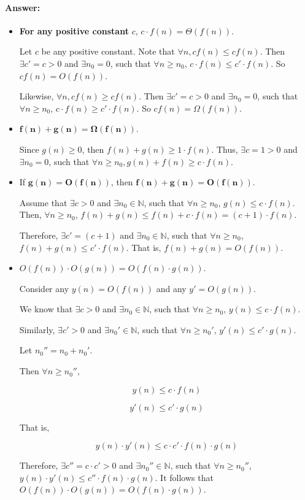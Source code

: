\documentclass[a4paper]{article}
\begin{document}
\paragraph{Answer:}
\begin{itemize}
\item \textbf{For any positive constant} $c$, $c \cdot f(n) = \Theta(f(n))$.

Let $c$ be any positive constant. Note that $\forall n, c f(n) \le c f(n)$. Then $\exists c' = c > 0$ and $\exists n_0 = 0$, such that $\forall n \ge n_0$, $c\cdot f(n) \le c' \cdot f(n)$. So $c f(n) = O(f(n))$.

Likewise, $\forall n, c f(n) \ge c f(n)$. Then $\exists c' = c > 0$ and $\exists n_0 = 0$, such that $\forall n \ge n_0$, $c\cdot f(n) \ge c' \cdot f(n)$. So $c f(n) = \Omega(f(n))$.

\item $\mathbf{f(n) + g(n) = \Omega(f(n))}$.

Since $g(n) \ge 0$, then $f(n) + g(n) \ge 1 \cdot f(n)$. Thus, $\exists c = 1 > 0$ and $\exists n_0 = 0$, such that $\forall n \ge n_0, g(n) + f(n) \ge c \cdot f(n)$.

\item If $\mathbf{g(n) = O(f(n))}$, then $\mathbf{f(n) + g(n) = O(f(n))}$.

Assume that $\exists c > 0$ and $\exists n_0 \in 
\mathbb{N}$, such that $\forall n \ge n_0$, $g(n) \le c \cdot f(n)$.
Then, $\forall n \ge n_0$, $f(n) + g(n) \le f(n) + c \cdot f(n) = (c+1) \cdot f(n)$.

Therefore, $\exists c' = (c+1)$ and $\exists n_0 \in 
\mathbb{N}$, such that $\forall n \ge n_0$, $f(n) + g(n) \le c' \cdot f(n)$. That is, $f(n) + g(n) = O(f(n))$.


\item $O(f(n)) \cdot O(g(n)) = O(f(n) \cdot g(n))$.

Consider any $y(n) = O(f(n))$ and any $y' = O(g(n))$.

We know that $\exists c > 0$ and $\exists n_0 \in 
\mathbb{N}$, such that $\forall n \ge n_0$, $y(n) \le c \cdot f(n)$.

Similarly, $\exists c' > 0$ and $\exists n_0' \in 
\mathbb{N}$, such that $\forall n \ge n_0'$, $y'(n) \le c' \cdot g(n)$.

Let $n_0'' = n_0 + n_0'$.

Then $\forall n \ge n_0''$,

$$y(n) \le c \cdot f(n)$$

$$y'(n) \le c' \cdot g(n)$$

That is,

$$y(n) \cdot y'(n) \le c \cdot c' \cdot f(n) \cdot g(n)$$

Therefore, $\exists c'' = c \cdot c' > 0$ and $\exists n_0'' \in 
\mathbb{N}$, such that $\forall n \ge n_0''$, $y(n)\cdot y'(n) \le c'' \cdot f(n) \cdot g(n)$. It follows that $O(f(n)) \cdot O(g(n)) = O(f(n) \cdot g(n))$.

\end{itemize}
\end{document}
